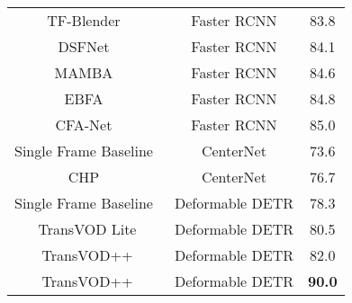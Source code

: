 \documentclass[10pt,journal,compsoc]{IEEEtran}
\begin{document}
\begin{table}[t!]
\begin{center}
\begin{tabular}{c|c|c}
TF-Blender~\cite{Cui_2021_ICCV} & Faster RCNN  & 83.8\\
DSFNet~\cite{lin2020dual} & Faster RCNN  & 84.1\\
MAMBA~\cite{sun2021mamba} & Faster RCNN  & 84.6\\
EBFA~\cite{han2020exploiting} & Faster RCNN  & 84.8\\
CFA-Net~\cite{han2021cfanet} & Faster RCNN  & 85.0\\
\midrule
Single Frame Baseline~\cite{zhou2019objects}  & CenterNet  &73.6\\ CHP~\cite{xu2020centernet} &  CenterNet &76.7\\ \midrule
Single Frame Baseline~\cite{zhu2020deformable} &  Deformable DETR & 78.3 \\
TransVOD Lite &Deformable DETR & 80.5 \\
TransVOD++ &Deformable DETR & 82.0 \\
TransVOD++ &Deformable DETR & \textbf{90.0} \\
\bottomrule
\end{tabular}
\end{center}
\label{table:mainresult_r101}
\vspace{-5mm}
\end{table}
\end{document}

